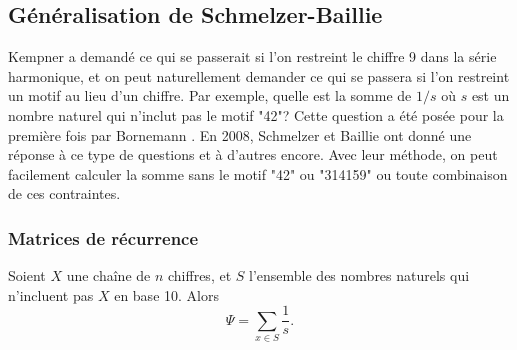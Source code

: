 \subsection{G\'en\'eralisation de Schmelzer-Baillie}
Kempner a demand\'e ce qui se passerait si l'on restreint le chiffre 9 dans la
s\'erie harmonique, et on peut naturellement demander ce qui se passera si l'on
restreint un motif au lieu d'un chiffre. Par exemple, quelle est la somme de
$1/s$ o\`u $s$ est un nombre naturel qui n'inclut pas le motif "42"? Cette
question a \'et\'e pos\'ee pour la premi\`ere fois par Bornemann \cite{SIAM}. En
2008, Schmelzer et Baillie \cite{schmelzer} ont donn\'e une r\'eponse \`a ce
type de questions et \`a d'autres encore. Avec leur m\'ethode, on peut
facilement calculer la somme sans le motif "42" ou "314159" ou toute combinaison
de ces contraintes.
\subsubsection{Matrices de r\'ecurrence}
\begin{defn}
	Soient $X$ une chaîne de $n$ chiffres, et $S$ l'ensemble des nombres
	naturels qui n'incluent pas $X$ en base 10. Alors
	\[
		\Psi = \sum_{x\in S} \frac{1}{s}.
	\]
\end{defn}

